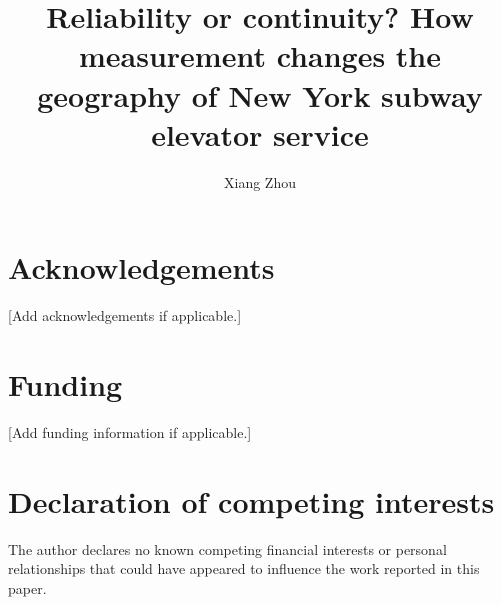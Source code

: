 \documentclass[preprint,12pt,authoryear]{elsarticle}
\begin{document}
\begin{frontmatter}

\title{Reliability or continuity? How measurement changes the geography of New York subway elevator service}

\author[aff1]{Xiang Zhou}



\end{frontmatter}

\section*{Acknowledgements}
[Add acknowledgements if applicable.]

\section*{Funding}
[Add funding information if applicable.]

\section*{Declaration of competing interests}
The author declares no known competing financial interests or personal relationships that could have appeared to influence the work reported in this paper.
\end{document}
